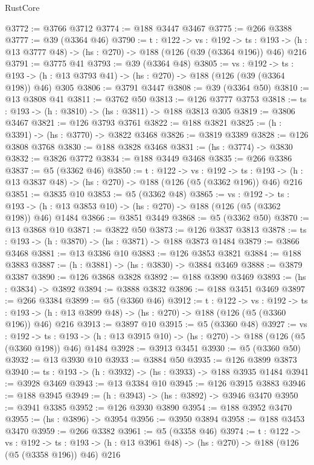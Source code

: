 \begin{lexlean}{RustCore}
\begin{coremodule}
@3772 := @3766 @3712
@3774 := @188 @3447 @3467
@3775 := @266 @3388
@3777 := @39 (@3364 @46)
@3790 := {t : @122} ->
  {vs : @192} ->
  {ts : @193} -> (h : @13 @3777 @48) -> (hs : @270) -> @188 (@126 (@39 (@3364 @196)) @46) @216
@3791 := @3775 @41
@3793 := @39 (@3364 @48)
@3805 := {vs : @192} ->
  {ts : @193} -> (h : @13 @3793 @41) -> (hs : @270) -> @188 (@126 (@39 (@3364 @198)) @46) @305
@3806 := @3791 @3447
@3808 := @39 (@3364 @50)
@3810 := @13 @3808 @41
@3811 := @3762 @50
@3813 := @126 @3777 @3753
@3818 := {ts : @193} -> (h : @3810) -> (hs : @3811) -> @188 @3813 @305
@3819 := @3806 @3467
@3821 := @126 @3793 @3761
@3822 := @188 @3821
@3825 := (h : @3391) -> (hs : @3770) -> @3822 @3468
@3826 := @3819 @3389
@3828 := @126 @3808 @3768
@3830 := @188 @3828 @3468
@3831 := (hs : @3774) -> @3830
@3832 := @3826 @3772
@3834 := @188 @3449 @3468
@3835 := @266 @3386
@3837 := @5 (@3362 @46)
@3850 := {t : @122} ->
  {vs : @192} ->
  {ts : @193} -> (h : @13 @3837 @48) -> (hs : @270) -> @188 (@126 (@5 (@3362 @196)) @46) @216
@3851 := @3835 @10
@3853 := @5 (@3362 @48)
@3865 := {vs : @192} ->
  {ts : @193} -> (h : @13 @3853 @10) -> (hs : @270) -> @188 (@126 (@5 (@3362 @198)) @46) @1484
@3866 := @3851 @3449
@3868 := @5 (@3362 @50)
@3870 := @13 @3868 @10
@3871 := @3822 @50
@3873 := @126 @3837 @3813
@3878 := {ts : @193} -> (h : @3870) -> (hs : @3871) -> @188 @3873 @1484
@3879 := @3866 @3468
@3881 := @13 @3386 @10
@3883 := @126 @3853 @3821
@3884 := @188 @3883
@3887 := (h : @3881) -> (hs : @3830) -> @3884 @3469
@3888 := @3879 @3387
@3890 := @126 @3868 @3828
@3892 := @188 @3890 @3469
@3893 := (hs : @3834) -> @3892
@3894 := @3888 @3832
@3896 := @188 @3451 @3469
@3897 := @266 @3384
@3899 := @5 (@3360 @46)
@3912 := {t : @122} ->
  {vs : @192} ->
  {ts : @193} -> (h : @13 @3899 @48) -> (hs : @270) -> @188 (@126 (@5 (@3360 @196)) @46) @216
@3913 := @3897 @10
@3915 := @5 (@3360 @48)
@3927 := {vs : @192} ->
  {ts : @193} -> (h : @13 @3915 @10) -> (hs : @270) -> @188 (@126 (@5 (@3360 @198)) @46) @1484
@3928 := @3913 @3451
@3930 := @5 (@3360 @50)
@3932 := @13 @3930 @10
@3933 := @3884 @50
@3935 := @126 @3899 @3873
@3940 := {ts : @193} -> (h : @3932) -> (hs : @3933) -> @188 @3935 @1484
@3941 := @3928 @3469
@3943 := @13 @3384 @10
@3945 := @126 @3915 @3883
@3946 := @188 @3945
@3949 := (h : @3943) -> (hs : @3892) -> @3946 @3470
@3950 := @3941 @3385
@3952 := @126 @3930 @3890
@3954 := @188 @3952 @3470
@3955 := (hs : @3896) -> @3954
@3956 := @3950 @3894
@3958 := @188 @3453 @3470
@3959 := @266 @3382
@3961 := @5 (@3358 @46)
@3974 := {t : @122} ->
  {vs : @192} ->
  {ts : @193} -> (h : @13 @3961 @48) -> (hs : @270) -> @188 (@126 (@5 (@3358 @196)) @46) @216

\end{coremodule}
\end{lexlean}
